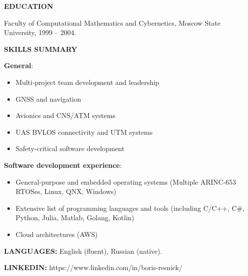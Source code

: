 \documentclass[a4paper]{article}
\begin{document}
    \textbf{EDUCATION}
    \vspace{3mm}
    
    Faculty of Computational Mathematics and Cybernetics, Moscow State University, 1999 -- 2004.
    \vspace{5mm}
    
    \textbf{SKILLS SUMMARY}
    \vspace{3mm}
    
    \textbf{General}:
	\begin{itemize}
		\item Multi-project team development and leadership
		\item GNSS and navigation
		\item Avionics and CNS/ATM systems
		\item UAS BVLOS connectivity and UTM systems
		\item Safety-critical software development
	\end{itemize}
    \vspace{3mm}
    
    \textbf{Software development experience}: 
	\begin{itemize}
		\item General-purpose and embedded operating systems (Multiple ARINC-653 RTOSes, Linux, QNX, Windows)
		\item Extensive list of programming languages and tools (including C/C++, C\#, Python, Julia, Matlab, Golang, Kotlin)
		\item Cloud architectures (AWS)
	\end{itemize}
    \vspace{5mm}
    
    \textbf{LANGUAGES:} English (fluent), Russian (native).

    \vspace{5mm}

	\textbf{LINKEDIN:} https://www.linkedin.com/in/boris-resnick/
\end{document}
